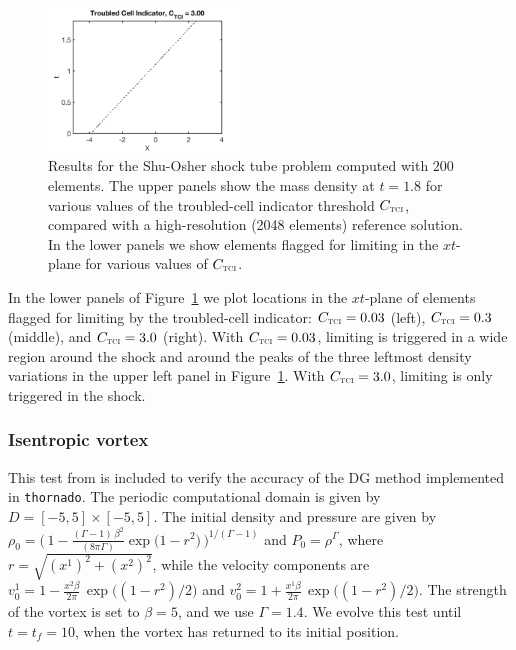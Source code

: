 \documentclass[letterpaper]{jpconf}
\newcommand{\f}[2]{\frac{#1}{#2}}
\newcommand{\TCI}{\textnormal{\tiny\textsc{TCI}}}
\newcommand{\thornado}{\texttt{thornado}}
\begin{document}
\begin{figure}[h]
\begin{minipage}{12pc}
    \includegraphics[width=12pc]{./Figures/ShuOsher_TCI_1500_Astronum_2018}
  \end{minipage}
  \caption{\label{fig:ShuOsher}Results for the Shu-Osher shock tube problem computed with $200$ elements.  The upper panels show the mass density at $t=1.8$ for various values of the troubled-cell indicator threshold $C_{\TCI}$, compared with a high-resolution (2048 elements) reference solution.  In the lower panels we show elements flagged for limiting in the $xt$-plane for various values of $C_{\TCI}$.}
\end{figure}
In the lower panels of Figure~\ref{fig:ShuOsher} we plot locations in the $xt$-plane of elements flagged for limiting by the troubled-cell indicator: $C_{\TCI}=0.03$ (left), $C_{\TCI}=0.3$ (middle), and $C_{\TCI}=3.0$ (right).  
With $C_{\TCI}=0.03$, limiting is triggered in a wide region around the shock and around the peaks of the three leftmost density variations in the upper left panel in Figure~\ref{fig:ShuOsher}.  
With $C_{\TCI}=3.0$, limiting is only triggered in the shock.  

\subsubsection{Isentropic vortex}
\label{sec:isentropicVortex}

This test from \cite{shu_1997} is included to verify the accuracy of the DG method implemented in \thornado.  
The periodic computational domain is given by $D=[-5,5]\times[-5,5]$.  
The initial density and pressure are given by $\rho_{0}=\big(\,1-\f{(\Gamma-1)\,\beta^{2}}{(8\pi\Gamma)}\exp\big(1-r^{2}\big)\,\big)^{1/(\Gamma-1)}$ and $P_{0}=\rho^{\Gamma}$, where $r=\sqrt{(x^{1})^{2}+(x^{2})^{2}}$, while the velocity components are $v_{0}^{1}=1-\f{x^{2}\beta}{2\pi}\,\exp\big((1-r^{2})/2\big)$ and $v_{0}^{2}=1+\f{x^{1}\beta}{2\pi}\,\exp\big((1-r^{2})/2\big)$.  
The strength of the vortex is set to $\beta=5$, and we use $\Gamma=1.4$.  
We evolve this test until $t=t_{f}=10$, when the vortex has returned to its initial position.  
\end{document}
